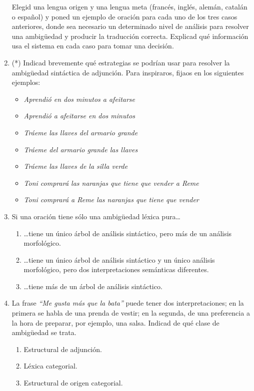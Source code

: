 \begin{enumerate}
Elegid una lengua origen y una lengua meta (francés, inglés, alemán, catalán o español) y poned un ejemplo de oración para cada uno de los tres casos anteriores, donde sea necesario un determinado nivel de análisis para resolver una ambigüedad y producir la traducción correcta. Explicad qué información usa el sistema en cada caso para tomar una decisión. 

\item (*) Indicad brevemente qué estrategias se podrían usar para resolver la ambigüedad sintáctica de adjunción. Para inspiraros, fijaos en los siguientes ejemplos: \begin{itemize} \item \emph{Aprendió en dos minutos a afeitarse} \item \emph{Aprendió a afeitarse en dos minutos} \item \emph{Tráeme las llaves del armario grande} \item \emph{Tráeme del armario grande las llaves} \item \emph{Tráeme las llaves de la silla verde} \item \emph{Toni comprará las naranjas que tiene que vender a Reme} \item \emph{Toni comprará a Reme las naranjas que tiene que vender} \end{itemize} 

\item Si una oración tiene sólo una ambigüedad léxica pura\ldots \begin{enumerate} \item \ldots tiene un único árbol de análisis sintáctico, pero más de un análisis morfológico. \item \ldots tiene un único árbol de análisis sintáctico y un único análisis morfológico, pero dos interpretaciones semánticas diferentes. \item \ldots tiene más de un árbol de análisis sintáctico. \end{enumerate} 

\item La frase \emph{``Me gusta más que la bata''} puede tener dos interpretaciones; en la primera se habla de una prenda de vestir; en la segunda, de una preferencia a la hora de preparar, por ejemplo, una salsa. Indicad de qué clase de ambigüedad se trata. \begin{enumerate} \item Estructural de adjunción. \item Léxica categorial. \item Estructural de origen categorial. \end{enumerate} 


\end{enumerate}
